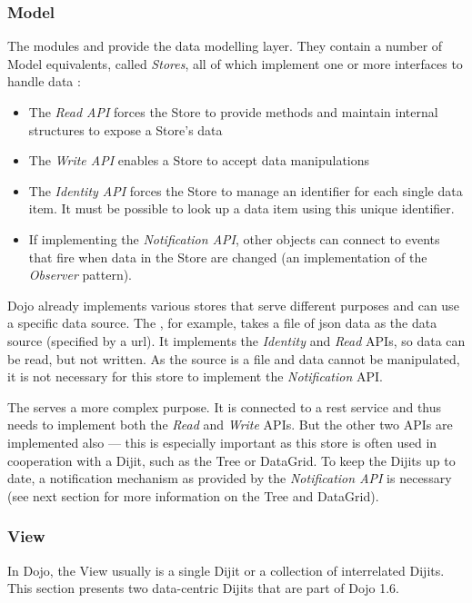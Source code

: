 \subsubsection*{Model}
The modules  and  provide the data modelling layer. They contain a number of Model equivalents, called \emph{Stores}, all of which implement one or more interfaces to handle data \cite{zyp}:
\begin{itemize}
	\item The \emph{Read API} forces the Store to provide methods and maintain internal structures to expose a Store's data
	\item The \emph{Write API} enables a Store to accept data manipulations
	\item The \emph{Identity API} forces the Store to manage an identifier for each single data item. It must be possible to look up a data item using this unique identifier.
	\item If implementing the \emph{Notification API}, other objects can connect to events that fire when data in the Store are changed (an implementation of the \emph{Observer} pattern).
\end{itemize}

Dojo already implements various stores that serve different purposes and can use a specific data source. The , for example, takes a file of \ac{json} data as the data source (specified by a \ac{url}). It implements the \emph{Identity} and \emph{Read} APIs, so data can be read, but not written. As the source is a file and data cannot be manipulated, it is not necessary for this store to implement the \emph{Notification} API.

The  serves a more complex purpose. It is connected to a \ac{rest} service and thus needs to implement both the \emph{Read} and \emph{Write} APIs. But the other two APIs are implemented also --- this is especially important as this store is often used in cooperation with a Dijit, such as the Tree or DataGrid. To keep the Dijits up to date, a notification mechanism as provided by the \emph{Notification API} is necessary (see next section for more information on the Tree and DataGrid).


\subsubsection*{View}
In Dojo, the View usually is a single Dijit or a collection of interrelated Dijits. This section presents two data-centric Dijits that are part of Dojo 1.6.


